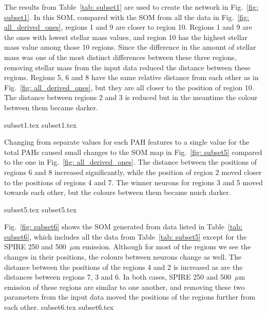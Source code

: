             The results from Table~\ref{tab: subset1} are used to create the network in Fig.~\ref{fig: subset1}. 
            In this SOM, compared with the SOM from all the data in Fig.~\ref{fig: all_derived_ones}, regions 1 and 9 are closer to region 10. 
            Regions 1 and 9 are the ones with lowest stellar mass values, and region 10 has the highest stellar mass value among those 10 regions. 
            Since the difference in the amount of stellar mass was one of the most distinct differences between these three regions, removing stellar mass from the input data reduced the distance between these regions.
            Regions 5, 6 and 8 have the same relative distance from each other as in Fig.~\ref{fig: all_derived_ones}, but they are all closer to the position of region 10.
            The distance between regions 2 and 3 is reduced but in the meantime the colour between them became darker.

            {subset1.tex}
            {subset1.tex}

            Changing from separate values for each PAH features to a single value for the total PAHs caused small changes to the SOM map in Fig.~\ref{fig: subset5} compared to the one in Fig.~\ref{fig: all_derived_ones}. 
            The distance between the positions of regions 6 and 8 increased significantly, while the position of region 2 moved closer to the positions of regions 4 and 7.
            The winner neurons for regions 3 and 5 moved towards each other, but the colours between them became much darker. 

            {subset5.tex}
            {subset5.tex}

            Fig.~\ref{fig: subset6} shows the SOM generated from data listed in Table~\ref{tab: subset6}, which includes all the data from Table~\ref{tab: subset5} except for the SPIRE 250 and 500~$\mu$m emission.
            Although for most of the regions we see the changes in their positions, the colours between neurons change as well. 
            The distance between the positions of the regions 4 and 2 is increased as are the
            distances between regions 7, 3 and 6.
            In both cases, SPIRE 250 and 500~$\mu$m emission of these regions are similar to one another, and removing these two parameters from the input data moved the positions of the regions further from each other. 
            {subset6.tex}
            {subset6.tex}
            
